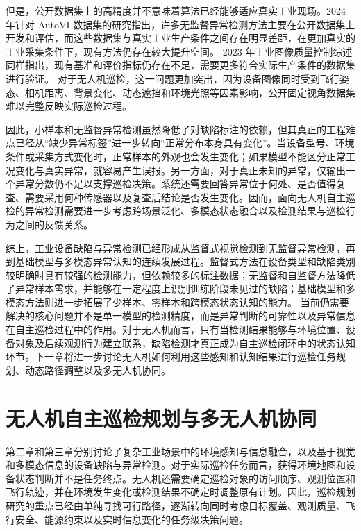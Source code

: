 但是，公开数据集上的高精度并不意味着算法已经能够适应真实工业现场。2024 年针对 AutoVI 数据集的研究指出，许多无监督异常检测方法主要在公开数据集上开发和评估，而这些数据集与真实工业生产条件之间存在明显差距，在更加真实的工业采集条件下，现有方法仍存在较大提升空间\cite{Carvalho2024AutoVI,shukla2025iadsurvey}。 2023 年工业图像质量控制综述同样指出，现有基准和评价指标仍存在不足，需要更多符合实际生产条件的数据集进行验证\cite{Diers2023IJCVIQC}。 对于无人机巡检，这一问题更加突出，因为设备图像同时受到飞行姿态、相机距离、背景变化、动态遮挡和环境光照等因素影响，公开固定视角数据集难以完整反映实际巡检过程。

因此，小样本和无监督异常检测虽然降低了对缺陷标注的依赖，但其真正的工程难点已经从“缺少异常标签”进一步转向“正常分布本身具有变化”。当设备型号、环境条件或采集方式变化时，正常样本的外观也会发生变化；如果模型不能区分正常工况变化与真实异常，就容易产生误报。另一方面，对于真正未知的异常，仅输出一个异常分数仍不足以支撑巡检决策。系统还需要回答异常位于何处、是否值得复查、需要采用何种传感器以及复查后结论是否发生变化。因而，面向无人机自主巡检的异常检测需要进一步考虑跨场景泛化、多模态状态融合以及检测结果与巡检行为之间的反馈关系。

综上，工业设备缺陷与异常检测已经形成从监督式视觉检测到无监督异常检测，再到基础模型与多模态异常认知的连续发展过程。监督式方法在设备类型和缺陷类别较明确时具有较强的检测能力，但依赖较多的标注数据；无监督和自监督方法降低了异常样本需求，并能够在一定程度上识别训练阶段未见过的缺陷；基础模型和多模态方法则进一步拓展了少样本、零样本和跨模态状态认知的能力\cite{Li2025IADSurvey,Li2025RGB3D,Mao2025IADSurvey,zhang2026continualad,zhu2024inctrl}。 当前仍需要解决的核心问题并不是单一模型的检测精度，而是异常判断的可靠性以及异常信息在自主巡检过程中的作用。对于无人机而言，只有当检测结果能够与环境位置、设备对象及后续观测行为建立联系，缺陷检测才真正成为自主巡检闭环中的状态认知环节。下一章将进一步讨论无人机如何利用这些感知和认知结果进行巡检任务规划、动态路径调整以及多无人机协同。

\section{无人机自主巡检规划与多无人机协同}

第二章和第三章分别讨论了复杂工业场景中的环境感知与信息融合，以及基于视觉和多模态信息的设备缺陷与异常检测。对于实际巡检任务而言，获得环境地图和设备状态判断并不是任务终点。无人机还需要确定巡检对象的访问顺序、观测位置和飞行轨迹，并在环境发生变化或检测结果不确定时调整原有计划。因此，巡检规划研究的重点已经由单纯寻找可行路径，逐渐转向同时考虑目标覆盖、观测质量、飞行安全、能源约束以及实时信息变化的任务级决策问题。


